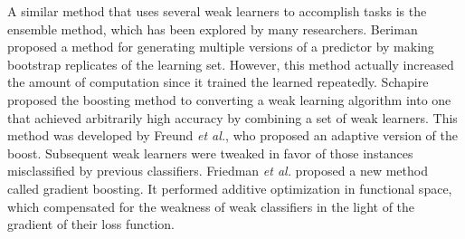 \documentclass[acmsmall,nonacm]{acmart}\settopmatter{}
\begin{document}
A similar method that uses several weak learners to accomplish tasks is the ensemble method, which has been explored by many researchers. 
Beriman\cite{BreimanBagging} proposed a method for generating multiple versions of a predictor by making bootstrap replicates of the learning set. 
However, this method actually increased the amount of computation since it trained the learned repeatedly.
Schapire\cite{Schapire1989The} proposed the boosting method to converting a weak learning algorithm into one that achieved arbitrarily high accuracy by combining a set of weak learners.
This method was developed by Freund \textit{et al.}\cite{Freund1995A}, who proposed an adaptive version of the boost.
Subsequent weak learners were tweaked in favor of those instances misclassified by previous classifiers. 
Friedman \textit{et al.}\cite{FriedmanGreedy} proposed a new method called gradient boosting. 
It performed additive optimization in functional space, which compensated for the weakness of weak classifiers in the light of the gradient of their loss function.



% 





\end{document}
